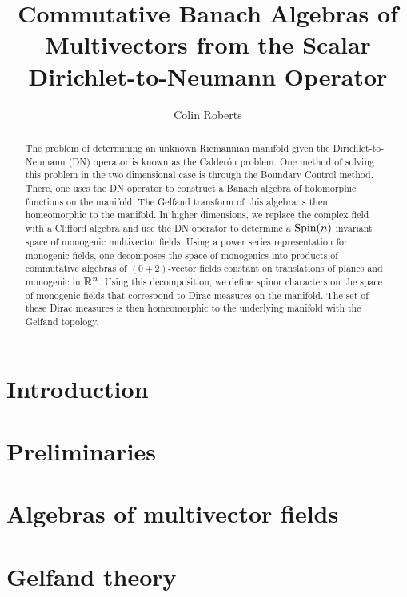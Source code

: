 \documentclass[12pt]{article}
\title{Commutative Banach Algebras of Multivectors from the Scalar Dirichlet-to-Neumann Operator}
\author{Colin Roberts}
\begin{document}
 \begin{titlingpage}
     \maketitle
     \vfill
     \begin{abstract}
        The problem of determining an unknown Riemannian manifold given the Dirichlet-to-Neumann (DN) operator is known as the Calder\'on problem.  One method of solving this problem in the two dimensional case is through the Boundary Control method.  There, one uses the DN operator to construct a Banach algebra of holomorphic functions on the manifold. The Gelfand transform of this algebra is then homeomorphic to the manifold. In higher dimensions, we replace the complex field with a Clifford algebra and use the DN operator to determine a $\operatorname{Spin}(n)$ invariant space of monogenic multivector fields. Using a power series representation for monogenic fields, one decomposes the space of monogenics into products of commutative algebras of $(0+2)$-vector fields constant on translations of planes and monogenic in $\mathbb{R}^n$. Using this decomposition, we define spinor characters on the space of monogenic fields that correspond to Dirac measures on the manifold.  The set of these Dirac measures is then homeomorphic to the underlying manifold with the Gelfand topology.
     \end{abstract}
 \end{titlingpage}

\tableofcontents

\section{Introduction}


\section{Preliminaries}


\section{Algebras of multivector fields}


\section{Gelfand theory}

\end{document}
